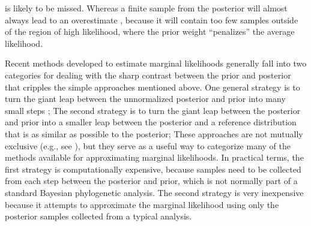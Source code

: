 is likely to be missed.
Whereas a finite sample from the posterior will almost always lead to an
overestimate \citep{Lartillot2006,Xie2011,Fan2011}, because it will contain too
few samples outside of the region of high likelihood, where the prior weight
``penalizes'' the average likelihood.

Recent methods developed to estimate marginal likelihoods generally fall into
two categories for dealing with the sharp contrast between the prior and
posterior that cripples the simple approaches mentioned above.
One general strategy is to turn the giant leap between the unnormalized
posterior and prior into many small steps ;
The second strategy is to turn the giant leap between the posterior and prior
into a smaller leap between the posterior and a reference distribution that is
as similar as possible to the posterior;
These approaches are not mutually exclusive (e.g., see \citet{Fan2011}), but
they serve as a useful way to categorize many of the methods available for
approximating marginal likelihoods.
In practical terms, the first strategy is computationally expensive, because
samples need to be collected from each step between the posterior and prior,
which is not normally part of a standard Bayesian phylogenetic analysis.
The second strategy is very inexpensive because it attempts to approximate the
marginal likelihood using only the posterior samples collected from a
typical analysis.

